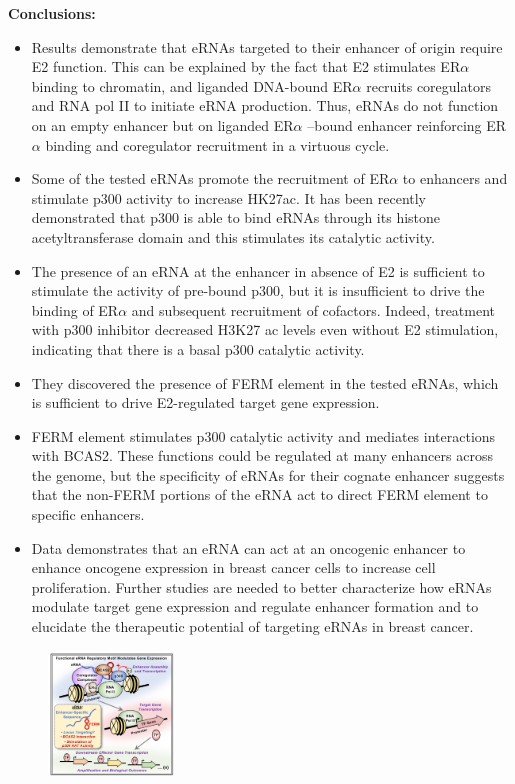 \textbf{Conclusions:}
\begin{itemize}
\tightlist
\item Results demonstrate that eRNAs targeted to their enhancer of origin require E2 function. This can be
explained by the fact that E2 stimulates ER$\alpha$ binding to chromatin, and liganded DNA-bound ER$\alpha$
recruits coregulators and RNA pol II to initiate eRNA production. Thus, eRNAs do not function on an
empty enhancer but on liganded ER$\alpha$ –bound enhancer reinforcing ER$\alpha$ binding and coregulator
recruitment in a virtuous cycle.
\item Some of the tested eRNAs promote the recruitment of ER$\alpha$ to enhancers and stimulate p300 activity
to increase HK27ac. It has been recently demonstrated that p300 is able to bind eRNAs through its
histone acetyltransferase domain and this stimulates its catalytic activity.
\item The presence of an eRNA at the enhancer in absence of E2 is sufficient to stimulate the activity of
pre-bound p300, but it is insufficient to drive the binding of ER$\alpha$ and subsequent recruitment of
cofactors. Indeed, treatment with p300 inhibitor decreased H3K27 ac levels even without E2
stimulation, indicating that there is a basal p300 catalytic activity.
\item They discovered the presence of FERM element in the tested eRNAs, which is sufficient to drive
E2-regulated target gene expression.
\item FERM element stimulates p300 catalytic activity and mediates interactions with BCAS2. These
functions could be regulated at many enhancers across the genome, but the specificity of eRNAs
for their cognate enhancer suggests that the non-FERM portions of the eRNA act to direct FERM
element to specific enhancers.
\item Data demonstrates that an eRNA can act at an oncogenic enhancer to enhance oncogene
expression in breast cancer cells to increase cell proliferation. Further studies are needed to
better characterize how eRNAs modulate target gene expression and regulate enhancer
formation and to elucidate the therapeutic potential of targeting eRNAs in breast cancer.
\end{itemize}

\begin{figure}
\centering
\includegraphics[width=0.3\textwidth]{../_resources/Screen_Shot_2022-12-20_at_14-17-02.png}
\caption{}
\end{figure}






 


